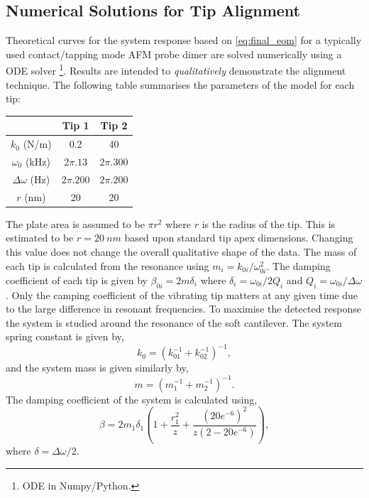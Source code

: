 \documentclass{article}
\begin{document}
\subsection{Numerical Solutions for Tip Alignment}

Theoretical curves for the system response based on \eqref{eq:final_eom} for a typically used contact/tapping mode AFM probe dimer are solved numerically using a ODE solver \footnote{ODE in Numpy/Python.}. Results are intended to \textit{qualitatively} demonstrate the alignment technique.
The following table summarises the parameters of the model for each tip:
\begin{center}
\begin{tabular}{c | c | c}
\hline
& \textbf{Tip 1} & \textbf{Tip 2} \\
\hline                 
$k_0$ (N/m) & 0.2 & 40 \\
$\omega_0$ (kHz) & $2\pi.13$ & $2\pi.300$ \\
$\Delta\omega$ (Hz) & $2\pi.200$ & $2\pi.200$ \\
$r$ (nm) & 20 & 20 \\
\hline 
\end{tabular}
\end{center}
The plate area is assumed to be $\pi r^2$ where $r$ is the radius of the tip. This is estimated to be $r=\SI{20}{nm}$ based upon standard tip apex dimensions. Changing this value does not change the overall qualitative shape of the data. The mass of each tip is calculated from the resonance using $m_i = k_{0i}/\omega_{0i}^2$. The damping coefficient of each tip is given by $\beta_{0i} = 2m\delta_i$ where $\delta_i = \omega_{0i}/2Q_i$ and $Q_i = \omega_{0i}/\Delta\omega$. Only the camping coefficient of the vibrating tip matters at any given time due to the large difference in resonant frequencies. To maximise the detected response the system is studied around the resonance of the soft cantilever.
The system spring constant is given by,
\begin{equation} k_0 = \left( k_{01}^{-1} + k_{02}^{-1} \right)^{-1}, \end{equation}
and the system mass is given similarly by,
\begin{equation} m = \left( m_1^{-1} + m_2^{-1} \right)^{-1}. \end{equation}
The damping coefficient of the system is calculated using,
\begin{equation}
\beta = 2m_1\delta_1 \left( 1 + \frac{r_1^2}{z} + \frac{(20e^{-6})^2}{z(2-20e^{-6})} \right),
\end{equation}
where $\delta = \Delta\omega/2$.
\end{document}
